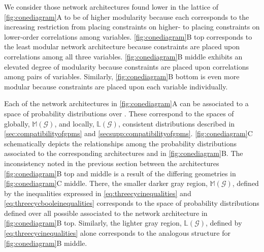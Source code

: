 We consider those network architectures found lower in the lattice of \ref{fig:conediagram}A to be of higher modularity because each corresponds to the increasing restriction from placing constraints on higher- to placing constraints on lower-order correlations among variables. \ref{fig:conediagram}B top corresponds to the least modular network architecture because constraints are placed upon correlations among all three variables. \ref{fig:conediagram}B middle exhibits an elevated degree of modularity because constraints are placed upon correlations among pairs of variables. Similarly, \ref{fig:conediagram}B bottom is even more modular because constraints are placed upon each variable individually.

Each of the network architectures in \ref{fig:conediagram}A can be associated to a space of probability distributions over \gnpm{}. These correspond to the spaces of globally, $\mathbb{M}(\mathcal{G})$, and locally, $\mathbb{L}(\mathcal{G})$, consistent distributions described in \ref{sec:compatibilityofgpms} and \ref{secsupp:compatibilityofgpms}. \ref{fig:conediagram}C schematically depicts the relationships among the probability distributions associated to the corresponding architectures and \gnpm{} in \ref{fig:conediagram}B. The inconsistency noted in the previous section between the architectures \ref{fig:conediagram}B top and middle is a result of the differing geometries in \ref{fig:conediagram}C middle. There, the smaller darker gray region, $\mathbb{M}(\mathcal{G})$, defined by the inequalities expressed in \ref{eq:threecycinequalities} and \ref{eq:threecycbooleinequalities} corresponds to the space of probability distributions defined over all possible \gnpm{} associated to the network architecture in \ref{fig:conediagram}B top. Similarly, the lighter gray region, $\mathbb{L}(\mathcal{G})$, defined by \ref{eq:threecycinequalities} alone corresponds to the analogous structure for \ref{fig:conediagram}B middle.


